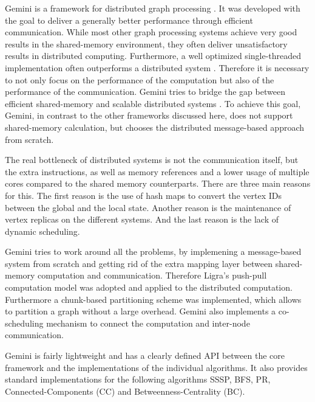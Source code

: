 
Gemini is a framework for distributed graph processing \cite{Gemini}.
It was developed with the goal to deliver a generally better performance through efficient communication.
While most other graph processing systems achieve very good results in the shared-memory environment, they often deliver unsatisfactory results in distributed computing.
Furthermore, a well optimized single-threaded implementation often outperforms a distributed system \cite{scalability}.
Therefore it is necessary to not only focus on the performance of the computation but also of the performance of the communication.
Gemini tries to bridge the gap between efficient shared-memory and scalable distributed systems \cite{Gemini}.
To achieve this goal, Gemini, in contrast to the other frameworks discussed here, does not support shared-memory calculation, but chooses the distributed message-based approach from scratch.

The real bottleneck of distributed systems is not the communication itself, but the extra instructions, as well as memory references and a lower usage of multiple cores compared to the shared memory counterparts.
There are three main reasons for this.
The first reason is the use of hash maps to convert the vertex IDs between the global and the local state.
Another reason is the maintenance of vertex replicas on the different systems.
And the last reason is the lack of dynamic scheduling.

Gemini tries to work around all the problems, by implemening a message-based system from scratch and getting rid of the extra mapping layer between shared-memory computation and communication.
Therefore Ligra's push-pull computation model was adopted and applied to the distributed computation.
Furthermore a chunk-based partitioning scheme was implemented, which allows to partition a graph without a large overhead.
Gemini also implements a co-scheduling mechanism to connect the computation and inter-node communication.

Gemini is fairly lightweight and has a clearly defined API between the core framework and the implementations of the individual algorithms.
It also provides standard implementations for the following algorithms SSSP, BFS, PR, Connected-Components (CC) and Betweenness-Centrality (BC).
